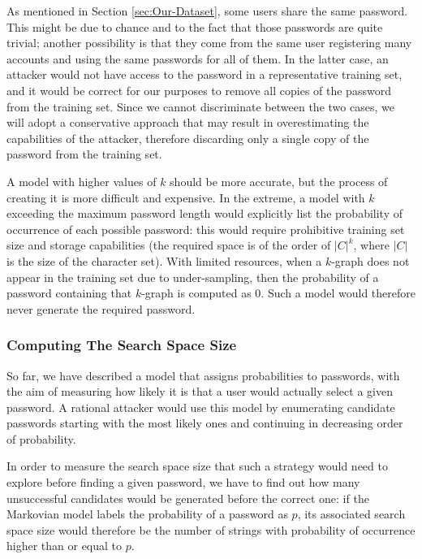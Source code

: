 \documentclass[a4paper,twocolumn]{article}
\begin{document}
As mentioned in Section \ref{sec:Our-Dataset}, some users share the
same password. This might be due to chance and to the fact that those
passwords are quite trivial; another possibility is that they come
from the same user registering many accounts and using the same passwords
for all of them. In the latter case, an attacker would not have access
to the password in a representative training set, and it would be
correct for our purposes to remove all copies of the password from
the training set. Since we cannot discriminate between the two cases,
we will adopt a conservative approach that may result in overestimating
the capabilities of the attacker, therefore discarding only a single
copy of the password from the training set.

A model with higher values of $k$ should be more accurate, but the
process of creating it is more difficult and expensive. In the extreme,
a model with $k$ exceeding the maximum password length would explicitly
list the probability of occurrence of each possible password: this
would require prohibitive training set size and storage capabilities
(the required space is of the order of $\left|C\right|^{k}$, where
$\left|C\right|$ is the size of the character set). With limited
resources, when a $k$-graph does not appear in the training set due
to under-sampling, then the probability of a password containing that
$k$-graph is computed as 0. Such a model would therefore never generate
the required password.


\subsubsection{Computing The Search Space Size}

So far, we have described a model that assigns probabilities to passwords,
with the aim of measuring how likely it is that a user would actually
select a given password. A rational attacker would use this model
by enumerating candidate passwords starting with the most likely ones
and continuing in decreasing order of probability.

In order to measure the search space size that such a strategy would
need to explore before finding a given password, we have to find out
how many unsuccessful candidates would be generated before the correct
one: if the Markovian model labels the probability of a password as
$p$, its associated search space size would therefore be the number
of strings with probability of occurrence higher than or equal to
$p.$
\end{document}
